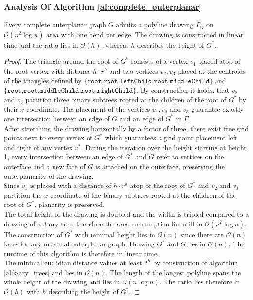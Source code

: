 \subsubsection{Analysis Of Algorithm \ref{al:complete_outerplanar}}

\begin{lemma}
	Every complete outerplanar graph $G$ admits a polyline drawing $\Gamma_G$ on $\mathcal{O}(n^2 \log n)$ area with one bend per edge. The drawing is constructed in linear time and the ratio lies in $\mathcal{O}(h)$, whereas $h$ describes the height of $G^*$.
\end{lemma}

\begin{proof}
The triangle around the root of $G^*$ consists of a vertex $v_1$ placed atop of the root vertex with distance $h\cdot r^h$ and two vertices $v_2,v_3$ placed at the centroids of the triangles defined by $\{\texttt{root,root.leftChild,root.middleChild}\}$ and $\{\texttt{root,root.middleChild,root.rightChild}\}$. By construction it holds, that $v_2$ and $v_3$ partition three binary subtrees rooted at the children of the root of $G^*$ by their $x$ coordinate. The placement of the vertices $v_1,v_2$ and $v_3$ guarantee exactly one intersection between an edge of $G$ and an edge of $G^*$ in $\Gamma$.\\
After stretching the drawing horizontally by a factor of three, there exist free grid points next to every vertex of $G^*$ which guarantees a grid point placement left and right of any vertex $v^*$. During the iteration over the height starting at height 1, every intersection between an edge of $G^*$ and $G$ refer to vertices on the outerface and a new face of $G$ is attached on the outerface, preserving the outerplanarity of the drawing.\\
Since $v_1$ is placed with a distance of $h\cdot r^h$ atop of the root of $G^*$ and $v_2$ and $v_3$ partition the $x$ coordinate of the binary subtrees rooted at the children of the root of $G^*$, planarity is preserved.\\
The total height of the drawing is doubled and the width is tripled compared to a drawing of a $3$-ary tree, therefore the area consumption lies still in $\mathcal{O}(n^2 \log n)$.\\
The construction of $G^*$ with minimal height lies in $\mathcal{O}(n)$ since there are $\mathcal{O}(n)$ faces for any maximal outerplanar graph. Drawing $G^*$ and $G$ lies in $\mathcal{O}(n)$. The runtime of this algorithm is therefore in linear time.\\
The minimal euclidian distance values at least $2^h$ by construction of algorithm \ref{al:k-ary_trees} and lies in $\mathcal{O}(n)$. The length of the longest polyline spans the whole height of the drawing and lies in $\mathcal{O}(n \log n)$. The ratio lies therefore in $\mathcal{O}(h)$ with $h$ describing the height of $G^*$.
\end{proof}
